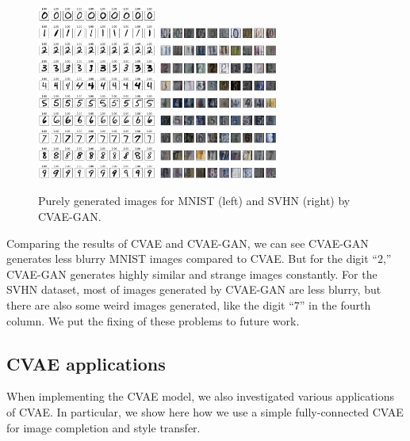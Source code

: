 \documentclass[10pt]{article}
\begin{document}
\begin{figure}[!ht]
\centering
\includegraphics[width=0.35\textwidth]{images/cvaegan-mnist.png}
\includegraphics[width=0.35\textwidth]{images/cvaegan-svhn.png}
\caption{Purely generated images for MNIST (left) and SVHN (right) by CVAE-GAN.}
\label{figure:cvaegan_label}
\end{figure}
Comparing the results of CVAE and CVAE-GAN, we can see CVAE-GAN generates less blurry MNIST images compared to CVAE. But for the digit ``$2$,'' CVAE-GAN generates highly similar and strange images constantly. For the SVHN dataset, most of images generated by CVAE-GAN are less blurry, but there are also some weird images generated, like the digit ``$7$'' in the fourth column. We put the fixing of these problems to future work.
\subsection{CVAE applications}\label{sub:cvae_app}

When implementing the CVAE model, we also investigated various applications of CVAE. In particular, we show here how we use a simple fully-connected CVAE for image completion and style transfer.
\end{document}
